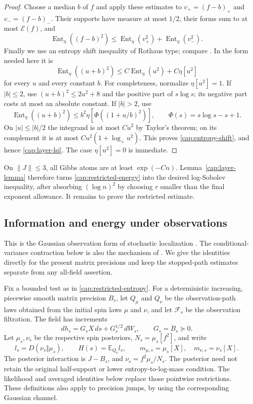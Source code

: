 \begin{proof}
Choose a median $b$ of $f$ and apply these estimates to $v_+=(f-b)_+$ and
$v_-=(f-b)_-$. Their supports have measure at most $1/2$, their forms sum to
at most $\mathcal E(f)$, and
\[
 \operatorname{Ent}_{\eta}((f-b)^2)
 \le\operatorname{Ent}_{\eta}(v_+^2)
      +\operatorname{Ent}_{\eta}(v_-^2).
\]
Finally we use an entropy shift inequality of Rothaus type; compare
\cite[Lemma~4]{BR2003}. In the form needed here it is
\begin{equation}\label{cap:entropy-shift}
 \operatorname{Ent}_{\eta}((u+b)^2)
 \le C\operatorname{Ent}_{\eta}(u^2)+C\eta[u^2]
\end{equation}
for every $u$ and every constant $b$. For completeness, normalize
$\eta[u^2]=1$. If $|b|\le2$, use $(u+b)^2\le2u^2+8$ and the positive part of
$s\log s$; its negative part costs at most an absolute constant. If $|b|>2$,
use
\[
 \operatorname{Ent}_{\eta}((u+b)^2)
 \le b^2\eta\!\left[
       \Phi\!\left((1+u/b)^2\right)\right],
 \qquad \Phi(s)=s\log s-s+1.
\]
On $|u|\le|b|/2$ the integrand is at most $Cu^2$ by Taylor's theorem; on its
complement it is at most $Cu^2(1+\log_+u^2)$. This proves
\eqref{cap:entropy-shift}, and hence \eqref{cap:layer-lsi}. The case
$\eta[u^2]=0$ is immediate. \end{proof}

On $\|J\|\le3$, all Gibbs atoms are at least $\exp(-Cn)$.
Lemma~\ref{cap:layer-lemma} therefore turns \eqref{cap:restricted-energy} into
the desired log-Sobolev inequality, after absorbing $(\log n)^2$ by choosing
$r$ smaller than the final exponent allowance. It remains to prove the
restricted estimate.

\subsection{Information and energy under observations}

This is the Gaussian observation form of stochastic localization
\cite{Eldan2013StochasticLocalization,ChenEldan2025Localization}. The
conditional-variance contraction below is also the mechanism of \cite[Lemma~9,
arXiv version~2]{EldanKoehlerZeitouni2022}. We give the identities directly
for the present matrix precisions and keep the stopped-path estimates separate
from any all-field assertion.

Fix a bounded test as in \eqref{cap:restricted-entropy}. For a deterministic
increasing, piecewise smooth matrix precision $B_s$, let $Q_\mu$ and $Q_\nu$
be the observation-path laws obtained from the initial spin laws $\mu$ and
$\nu$, and let $\mathcal F_s$ be the observation filtration. The field has increments
\[
 dh_s=G_sX\,ds+G_s^{1/2}\,dW_s,\qquad G_s=\dot B_s\succeq0.
\]
Let $\mu_s,\nu_s$ be the respective spin posteriors,
$N_s=\mu_s[f^2]$, and write
\[
 l_s=D(\nu_s\Vert\mu_s),\qquad
 H(s)=\mathbb E_{Q_\nu}l_s,\qquad
 m_{\mu,s}=\mu_s[X],\quad m_{\nu,s}=\nu_s[X].
\]
The posterior interaction is $J-B_s$, and
$\nu_s=f^2\mu_s/N_s$. The posterior need not retain the original
half-support or lower entropy-to-log-mass condition. The likelihood and
averaged identities below replace those pointwise restrictions.
These definitions also apply to precision jumps,
by using the corresponding Gaussian channel.

